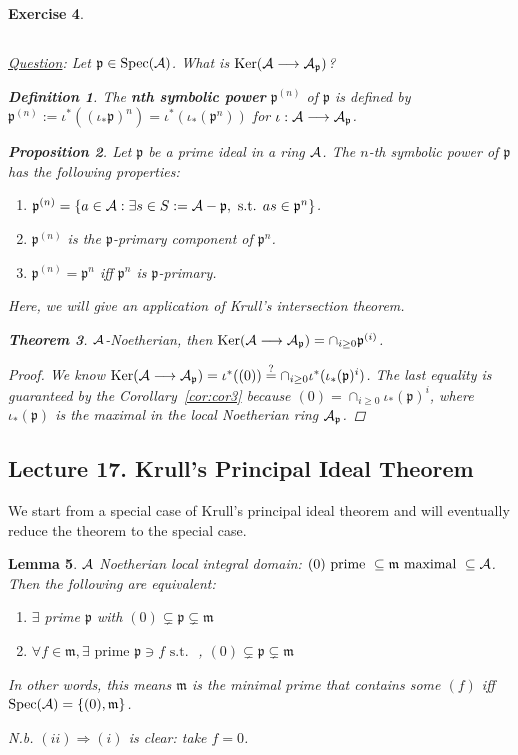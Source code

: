 \documentclass[11pt]{article}
\newtheorem{thm}{Theorem}[section]
\newtheorem{prop}[thm]{Proposition}
\newtheorem{lemma}[thm]{Lemma}
\newtheorem{dfn}[thm]{Definition}
\newtheorem{exercise}[thm]{Exercise}
\newcommand{\scm}{{\mathfrak m}}
\newcommand{\scp}{{\mathfrak p}}
\newcommand{\cala}{{\cal A}}
\newcommand{\Lrta}{\Longrightarrow}
\newcommand{\lrta}{\longrightarrow}
\begin{document}
\begin{exercise}
\subsection*{}
\underline{Question}: Let $\scp\in \text{Spec}(\cala)$. What is $\text{Ker}(\cala\lrta \cala_\scp)$?
\begin{dfn}\label{def:symbolic_power}
The \textbf{nth symbolic power} $\scp^{(n)}$ of $\scp$ is defined by $\scp^{(n)}:=\iota^*((\iota_*\scp)^n)=\iota^*(\iota_*(\scp^n))$ for $\iota:\cala\lrta \cala_\scp$.
\end{dfn}
\begin{prop}
Let $\scp$ be a prime ideal in  a ring $\cala$. The $n$-th symbolic power of $\scp$ has the following properties:
\begin{enumerate}[label=(\alph*)]
\item $\scp^{(n)}=\{a\in\cala:\exists s\in S:=\cala-\scp, \text{ s.t. } as\in\scp^{n}\}$.
\item $\scp^{(n)}$ is the $\scp$-primary component of $\scp^n$.
\item $\scp^{(n)}=\scp^n$ iff $\scp^n$ is $\scp$-primary.
\end{enumerate}
\end{prop}
Here, we will give an application of Krull's intersection theorem.
\begin{thm}\label{thm:Noetherian_localization_kernel}
 $\cala$-Noetherian, then $ \text{Ker}(\cala\lrta \cala_\scp)=\cap_{i\geq 0}\scp^{(i)}$.
\end{thm}
\begin{proof}
We know $\text{Ker}(\cala\lrta \cala_\scp)=\iota^*((0))\overset{?}{=}\cap_{i\geq 0}\iota^*(\iota_*(\scp)^i)$.
 The last equality is guaranteed by the Corollary~\ref{cor:cor3} because $(0)=\cap_{i\geq 0}\iota_*(\scp)^i$, where $\iota_*(\scp)$ is the maximal in the local Noetherian ring $\cala_\scp$. 
\end{proof}
\end{exercise}



\subsection{Lecture 17. Krull's Principal Ideal Theorem}
We start from a special case of Krull's principal ideal theorem and will eventually reduce the theorem to the special case.
\begin{lemma}\label{lem_5}
$\cala$ Noetherian local integral domain: $(0)\text{ prime } \subseteq \scm \text{ maximal }\subseteq \cala$. Then the following are equivalent:
\begin{enumerate}[label=(\roman*)]
\item $\exists $ prime $\scp$ with $(0)\subsetneq \scp\subsetneq \scm$
\item $\forall f\in\scm,\exists\text{ prime }\scp\ni f \text{ s.t. }$ , $(0)\subsetneq \scp\subsetneq \scm$
\end{enumerate}
In other words, this means $\scm$ is the minimal prime that contains some $(f)$ iff $\text{Spec}(\cala)=\{(0),\scm\}$. 

N.b. $(ii)\Lrta(i)$ is clear: take $f=0$.
\end{lemma}
\end{document}
